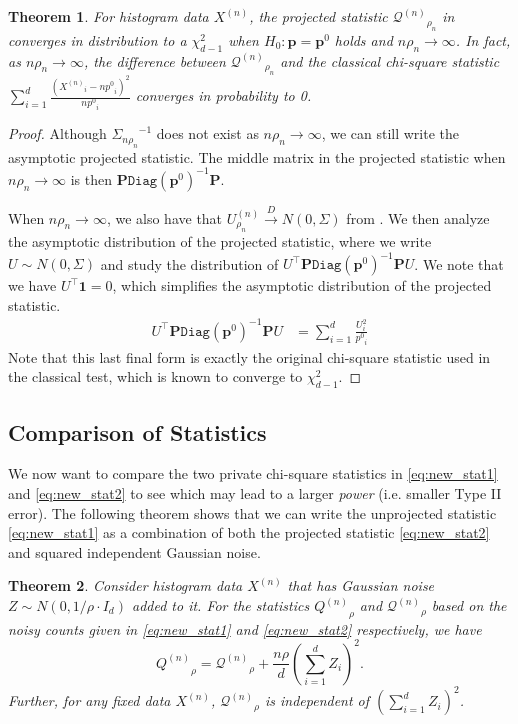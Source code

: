 \documentclass[twoside,letterpaper]{article} \usepackage{aistats2017}
\newtheorem{theorem}{Theorem}[section]
\theoremstyle{definition}
\theoremstyle{remark}
\begin{document}
\begin{theorem}
For histogram data ${X^{({n})}}$, the projected statistic ${\pmb{\mathcal{Q}}^{({n})}}_{\rho_n}$ in  converges in distribution to a $\chi^2_{d-1}$ when $H_0: {\mathbf{p}} = {{\mathbf{p}}^0}$ holds and $n \rho_n \to \infty$.  In fact, as $n \rho_n \to \infty$, the difference between ${\pmb{\mathcal{Q}}^{({n})}}_{\rho_n}$ and the classical chi-square statistic $\sum_{i=1}^d \frac{\left({X^{({n})}}_i - n {p^0}_i\right)^2}{n{p^0}_i}$ converges in probability to 0.
\label{cor:proj}
\end{theorem}
\begin{proof}
Although ${{\Sigma}_{{n\rho_n}}}^{-1}$ does not exist as $n \rho_n \to \infty$, we can still write the asymptotic projected statistic.  The middle matrix in the projected statistic when $n \rho_n \to \infty$ is then ${\pmb{P}}{\ensuremath{\mathtt{Diag}}}({{\mathbf{p}}^0})^{-1}{\pmb{P}}$.

When $n \rho_n \to \infty$, we also have that ${U^{(n)}_{{\rho_n}}} \stackrel{D}{\to} N(0,{\Sigma})$ from .  We then analyze the asymptotic distribution of the projected statistic, where we write $U \sim N(0,{\Sigma})$ and study the distribution of $U^\intercal{\pmb{P}}{\ensuremath{\mathtt{Diag}}}({{\mathbf{p}}^0})^{-1} {\pmb{P}} U$.  We note that we have $U^\intercal {\pmb{1}} = 0$, which simplifies the asymptotic distribution of the projected statistic.
\begin{align*}
U^\intercal{\pmb{P}}{\ensuremath{\mathtt{Diag}}}({{\mathbf{p}}^0})^{-1} {\pmb{P}}  U & = \sum_{i=1}^d \frac{U_i^2}{{p^0}_i} 
\end{align*}
Note that this last final form is exactly the original chi-square statistic used in the classical test, which is known to converge to $\chi^2_{d-1}$. 
\end{proof}
\fi

\subsection{Comparison of Statistics}
We now want to compare the two private chi-square statistics in \eqref{eq:new_stat1} and \eqref{eq:new_stat2} to see which may lead to a larger \emph{power} (i.e. smaller Type II error).  The following theorem shows that we can write the unprojected statistic \eqref{eq:new_stat1} as a combination of both the projected statistic \eqref{eq:new_stat2} and squared independent Gaussian noise.
\begin{theorem}
Consider histogram data ${X^{({n})}}$ that has Gaussian noise $Z \sim N(0,1/\rho\cdot I_d)$ added to it.  For the statistics ${Q^{({n})}}_\rho$ and ${\pmb{\mathcal{Q}}^{({n})}}_{\rho}$ based on the noisy counts given in \eqref{eq:new_stat1} and \eqref{eq:new_stat2} respectively, we have
$$
{Q^{({n})}}_\rho = {\pmb{\mathcal{Q}}^{({n})}}_{\rho} + \frac{n\rho}{d} \left(\sum_{i=1}^d Z_i \right)^2.
$$
Further, for any fixed data ${X^{({n})}}$, ${\pmb{\mathcal{Q}}^{({n})}}_{\rho} $ is independent of $\left(\sum_{i=1}^d Z_i \right)^2$.  
\label{thm:compare}
\end{theorem}
\end{document}
